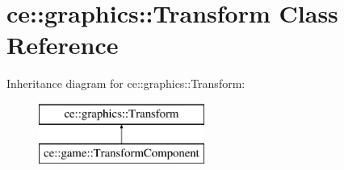 \hypertarget{classce_1_1graphics_1_1_transform}{}\section{ce\+:\+:graphics\+:\+:Transform Class Reference}
\label{classce_1_1graphics_1_1_transform}
Inheritance diagram for ce\+:\+:graphics\+:\+:Transform\+:\begin{figure}[H]
\begin{center}
\leavevmode
\includegraphics[height=2.000000cm]{classce_1_1graphics_1_1_transform}
\end{center}
\end{figure}
